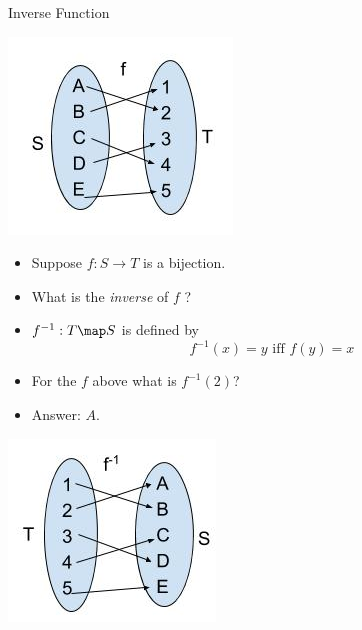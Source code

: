 \documentclass{beamer}
\begin{document}
\begin{frame}{Inverse Function}

\begin{center}
\includegraphics[scale=0.25]{function4}
\end{center}

\begin{itemize}
\item Suppose $f:S\to T$ is a bijection.
\item What is the \emph{inverse} of $f$ ?
\item $f^{-1}:T\map S$ is defined by
$$f^{-1}(x) = y \text{ iff } f(y) = x$$
\item For the $f$ above what is $f^{-1}(2)$?
\item Answer: $A$.
\end{itemize}

\pause

\begin{center}
\includegraphics[scale=0.25]{f-inverse}
\end{center}

\end{frame}
\end{document}
